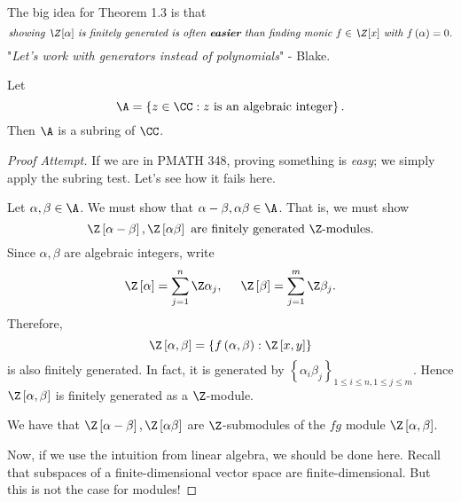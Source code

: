 \documentclass[pmath441]{subfiles}
\begin{document}
    \np The big idea for Theorem 1.3 is that
    \begin{equation*}
        \text{\textit{showing $\Z\left[ \alpha \right]$ is finitely generated is often \textbf{easier} than finding monic $f\in\Z\left[ x \right]$ with $f\left( \alpha \right) = 0$.}}
    \end{equation*}
    "\textit{Let's work with generators instead of polynomials}" - Blake.
    
    \begin{theorem}{}
        Let
        \begin{equation*}
            \A = \left\lbrace z\in\CC: z\text{ is an algebraic integer} \right\rbrace.
        \end{equation*}
        Then $\A$ is a subring of $\CC$.
    \end{theorem}

    \begin{proof}[Proof Attempt]
        If we are in PMATH 348, proving something is \textit{easy}; we simply apply the subring test. Let's see how it fails here.

        Let $\alpha,\beta\in\A$. We must show that $\alpha-\beta, \alpha\beta\in\A$. That is, we must show
        \begin{equation*}
            \Z\left[ \alpha-\beta \right],\Z\left[ \alpha\beta \right]\text{ are finitely generated $\Z$-modules}.
        \end{equation*}
        Since $\alpha,\beta$ are algebraic integers, write
        \begin{equation*}
            \Z\left[ \alpha \right] = \sum^{n}_{j=1} \Z\alpha_j, \hspace{0.5cm} \Z\left[ \beta \right] = \sum^{m}_{j=1} \Z\beta_j.
        \end{equation*}
        Therefore,
        \begin{equation*}
            \Z\left[ \alpha,\beta \right] = \left\lbrace f\left( \alpha,\beta \right): \Z\left[ x,y \right] \right\rbrace
        \end{equation*}
        is also finitely generated. In fact, it is generated by $\left\lbrace \alpha_i\beta_j \right\rbrace^{}_{1\leq i\leq n, 1\leq j\leq m}$. Hence $\Z\left[ \alpha,\beta \right]$ is finitely generated as a $\Z$-module.

        We have that $\Z\left[ \alpha-\beta \right], \Z\left[ \alpha\beta \right]$ are $\Z$-submodules of the $fg$ module $\Z\left[ \alpha,\beta \right]$.

        Now, if we use the intuition from linear algebra, we should be done here. Recall that subspaces of a finite-dimensional vector space are finite-dimensional. But this is not the case for modules!

    \end{proof}
\end{document}
